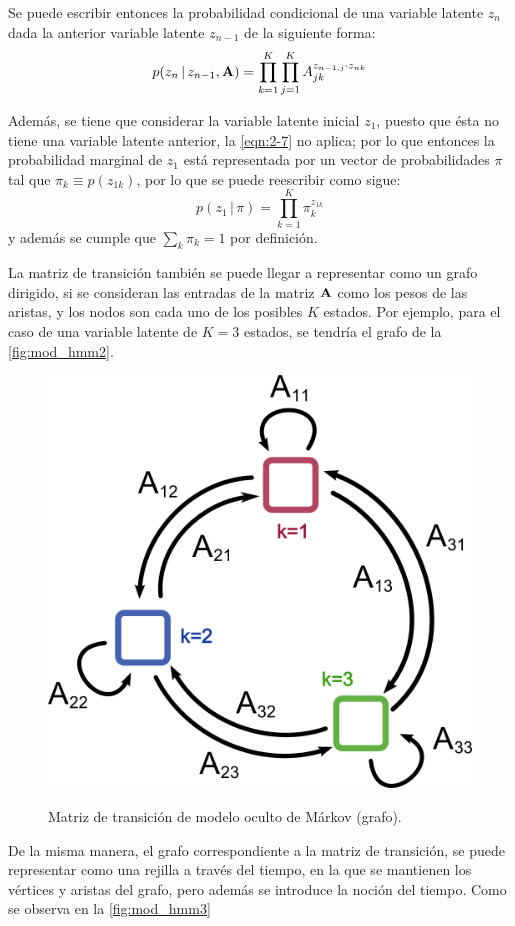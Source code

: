 Se puede escribir entonces la probabilidad condicional de una variable latente $z_n$ dada la anterior variable latente $z_{n-1}$ de la siguiente forma: 
\begin{equation}
\label{eqn:2-8}
p(z_n \,|\, z_{n-1}, \textbf{A}) = \prod_{k=1}^K \prod_{j=1}^K A_{jk}^{z_{n-1, j} 
        \cdot z_{nk}}
\end{equation}

Además, se tiene que considerar la variable latente inicial $z_1$, puesto que ésta no tiene una variable latente anterior, la \autoref{eqn:2-7} no aplica; por lo que entonces la probabilidad marginal de $z_1$ está representada por un vector de probabilidades $\pi$ tal que $\pi_k \equiv p(z_{1k})$, por lo que se puede reescribir como sigue: 
\begin{equation}
p(z_1 \,|\, \pi) = \prod_{k=1}^K \pi_k^{z_{1k}}
\label{eqn:2-9}
\end{equation}
y además se cumple que $\sum_k \pi_k = 1$ por definición.

La matriz de transición también se puede llegar a representar como un grafo dirigido, si se consideran las entradas de la matriz $\textbf{A}$ como los pesos de las aristas, y los nodos son cada uno de los posibles $K$ estados. Por ejemplo, para el caso de una variable latente de $K = 3$ estados, se tendría el grafo de la \autoref{fig:mod_hmm2}.

\begin{figure}[hbt]
        \myfloatalign
        {\includegraphics[width=0.4\linewidth]{gfx/chap2/mod-hmm2}}
        \caption{Matriz de transición de modelo oculto de Márkov (grafo).}
        \label{fig:mod_hmm2}
\end{figure}

De la misma manera, el grafo correspondiente a la matriz de transición, se puede representar como una rejilla a través del tiempo, en la que se mantienen los vértices y aristas del grafo, pero además se introduce la noción del tiempo. Como se observa en la \autoref{fig:mod_hmm3} 

